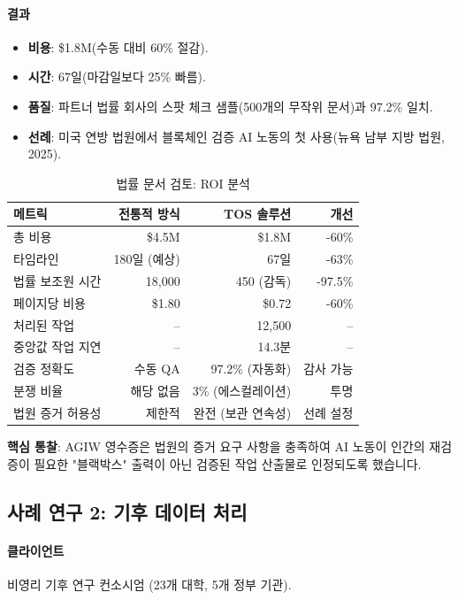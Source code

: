 \documentclass[11pt]{article}
\begin{document}
\paragraph{결과}
\begin{itemize}[noitemsep]
  \item \textbf{비용}: \$1.8M(수동 대비 60\% 절감).
  \item \textbf{시간}: 67일(마감일보다 25\% 빠름).
  \item \textbf{품질}: 파트너 법률 회사의 스팟 체크 샘플(500개의 무작위 문서)과 97.2\% 일치.
  \item \textbf{선례}: 미국 연방 법원에서 블록체인 검증 AI 노동의 첫 사용(뉴욕 남부 지방 법원, 2025).
\end{itemize}

\begin{table}[H]
\centering
\caption{법률 문서 검토: ROI 분석}
\label{tab:legal-roi}
\begin{tabular}{@{}lrrr@{}}
\toprule
\textbf{메트릭} & \textbf{전통적 방식} & \textbf{TOS 솔루션} & \textbf{개선} \\ \midrule
총 비용 & \$4.5M & \$1.8M & -60\% \\
타임라인 & 180일 (예상) & 67일 & -63\% \\
법률 보조원 시간 & 18,000 & 450 (감독) & -97.5\% \\
페이지당 비용 & \$1.80 & \$0.72 & -60\% \\
처리된 작업 & -- & 12,500 & -- \\
중앙값 작업 지연 & -- & 14.3분 & -- \\
검증 정확도 & 수동 QA & 97.2\% (자동화) & 감사 가능 \\
분쟁 비율 & 해당 없음 & 3\% (에스컬레이션) & 투명 \\
법원 증거 허용성 & 제한적 & 완전 (보관 연속성) & 선례 설정 \\
\bottomrule
\end{tabular}
\end{table}

\textbf{핵심 통찰}: AGIW 영수증은 법원의 증거 요구 사항을 충족하여 AI 노동이 인간의 재검증이 필요한 "블랙박스" 출력이 아닌 검증된 작업 산출물로 인정되도록 했습니다.

\subsection{사례 연구 2: 기후 데이터 처리}

\paragraph{클라이언트} 비영리 기후 연구 컨소시엄 (23개 대학, 5개 정부 기관).
\end{document}
